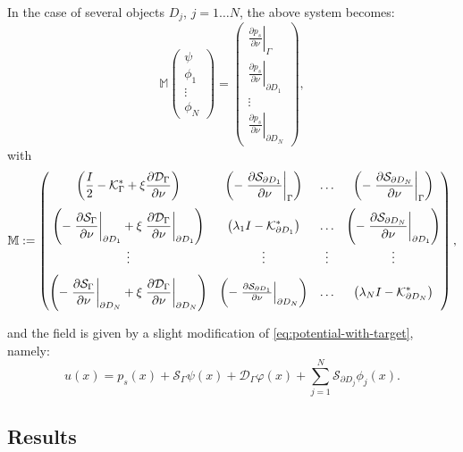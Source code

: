 In the case of several objects $D_j$, $j=1\ldots N$, the above system becomes:
\[
\mathbb{M}\left(\begin{alignedat}{1}\psi\\
\phi_1 \\
\vdots \\
\phi_{N}
\end{alignedat}
\right)=\left(\begin{alignedat}{1}\left.\frac{\partial p_s}{\partial\nu}\right|_{\Gamma}\\
\left.\frac{\partial p_s}{\partial\nu}\right|_{\partial D_1} \\
\vdots \\
\left.\frac{\partial p_s}{\partial\nu}\right|_{\partial D_{N}}
\end{alignedat}
\right),
\]
with
\[
\mathbb{M}:=\left(\begin{matrix} \left( \ds
\frac{I}{2}-\mathcal{K}_{\Gamma}^{*}
+\xi\frac{\partial\mathcal{D}_{\Gamma}}{\partial\nu}\right) &\ds
\left(-\left.\frac{\partial\mathcal{S}_{\partial D_1}}{\partial\nu}\right|_{\Gamma}\right) &\ds
\ldots &\ds
\left(-\left.\frac{\partial\mathcal{S}_{\partial D_{N}}}{\partial\nu}\right|_{\Gamma}\right)\\
\nm \ds
\left(-\left.\frac{\partial\mathcal{S}_{\Gamma}}{\partial\nu}\right|_{\partial
D_1}+\xi\left.\frac{\partial
\mathcal{D}_{\Gamma}}{\partial\nu}\right|_{\partial D_1}\right) &
\ds \left(\lambda_1 I-\mathcal{K}_{\partial D_1}^{*}\right) &\ds 
\ldots &\ds
\left(-\left.\frac{\partial\mathcal{S}_{\partial D_N}}{\partial\nu}\right|_{\partial D_1}\right) \\
\vdots &\ds \vdots &\ds \vdots &\ds \vdots \\
\nm \ds
\left(-\left.\frac{\partial\mathcal{S}_{\Gamma}}{\partial\nu}\right|_{\partial
D_N}+\xi\left.\frac{\partial
\mathcal{D}_{\Gamma}}{\partial\nu}\right|_{\partial D_N}\right) &
\left(-\left.\frac{\partial\mathcal{S}_{\partial D_1}}{\partial\nu}\right|_{\partial D_N}\right) &\ds 
\ds \ldots &\ds
\left(\lambda_N I-\mathcal{K}_{\partial D_N}^{*}\right)
\end{matrix}
\right),
\]

and the field is given by a slight modification of \ref{eq:potential-with-target},
namely:
\begin{equation}
u(x)=p_s(x)+\mathcal{S}_{\Gamma}\psi(x)+\mathcal{D}_{\Gamma}\varphi(x)+
\sum_{j=1}^{N}\mathcal{S}_{\partial D_j}\phi_j(x).
\end{equation}

\subsection{Results}

